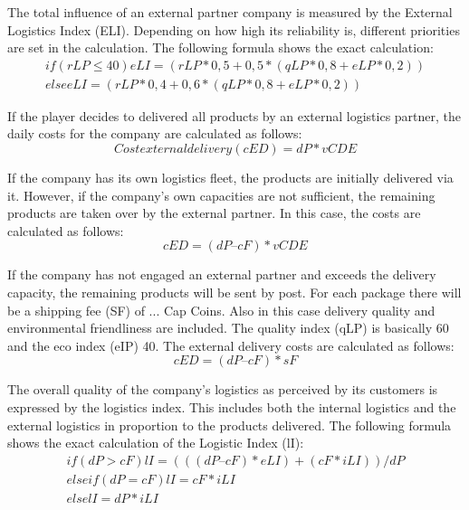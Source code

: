 The total influence of an external partner company is measured by the External Logistics Index (ELI). Depending on how high its reliability is, different priorities are set in the calculation. The following formula shows the exact calculation: 
\begin{equation}
\begin{aligned}
    if (rLP ≤ 40) eLI = { (rLP*0,5 + 0,5*(qLP*0,8 + eLP*0,2)) } \\
    else eLI = { (rLP*0,4 + 0,6*(qLP*0,8 + eLP*0,2)) }
\end{aligned}
\end{equation}

If the player decides to delivered all products by an external logistics partner, the daily costs for the company are calculated as follows:
\begin{equation}
    Cost external delivery (cED) = dP * vCDE
\end{equation}

If the company has its own logistics fleet, the products are initially delivered via it. However, if the company's own capacities are not sufficient, the remaining products are taken over by the external partner. In this case, the costs are calculated as follows: 
\begin{equation}
    cED = ( dP – cF ) * vCDE
\end{equation}

If the company has not engaged an external partner and exceeds the delivery capacity, the remaining products will be sent by post. For each package there will be a shipping fee (SF) of ... Cap Coins. Also in this case delivery quality and environmental friendliness are included. The quality index (qLP) is basically 60 and the eco index (eIP) 40. The external delivery costs are calculated as follows:  
\begin{equation}
    cED = ( dP – cF ) * sF
\end{equation}

The overall quality of the company's logistics as perceived by its customers is expressed by the logistics index. This includes both the internal logistics and the external logistics in proportion to the products delivered. The following formula shows the exact calculation of the Logistic Index (lI):
\begin{equation}
\begin{aligned}
    if ( dP > cF ) lI = { ((( dP – cF) * eLI ) + ( cF * iLI )) / dP} \\
    elseif ( dP = cF ) lI = { cF * iLI } \\
    else lI = { dP * iLI }  
\end{aligned}
\end{equation}